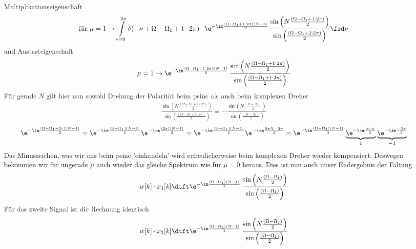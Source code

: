 \begin{ExCalc}
Multiplikationseigenschaft
\begin{align}
\text{für   }\mu=1\rightarrow
\int\limits_{\nu=0}^{2\pi}
\delta(-\nu+\Omega-\Omega_1+1\cdot2\pi)
\cdot
\e^{-\im\frac{(\Omega-\Omega_1 + 1\cdot2\pi)(N-1)}{2}}\,
\frac{\sin\left(N\frac{(\Omega-\Omega_1 + 1\cdot2\pi)}{2}\right)}{\sin\left(\frac{(\Omega-\Omega_1 + 1\cdot2\pi)}{2}\right)}\fsd \nu
\end{align}
und Austasteigenschaft
\begin{align}
\mu=1\rightarrow
\e^{-\im\frac{(\Omega-\Omega_1 + 1\cdot2\pi)(N-1)}{2}}\,
\frac{\sin\left(N\frac{(\Omega-\Omega_1 + 1\cdot2\pi)}{2}\right)}{\sin\left(\frac{(\Omega-\Omega_1 + 1\cdot2\pi)}{2}\right)}
\end{align}
Für gerade $N$ gilt hier nun sowohl Drehung der Polarität beim psinc als auch beim komplexen Dreher
\begin{align}
\frac{\sin\left(N\frac{(\Omega-\Omega_1 + 1\cdot2\pi)}{2}\right)}{\sin\left(\frac{(\Omega-\Omega_1 + 1\cdot2\pi)}{2}\right)}
= -
\frac{\sin\left(N\frac{(\Omega-\Omega_1)}{2}\right)}{\sin\left(\frac{(\Omega-\Omega_1)}{2}\right)}
\end{align}
%
\begin{align}
\e^{-\im\frac{(\Omega-\Omega_1 + 2\pi)(N-1)}{2}}=
\e^{-\im\frac{(\Omega-\Omega_1)(N-1)}{2}}
\e^{-\im\frac{(2\pi)(N-1)}{2}}=
\e^{-\im\frac{(\Omega-\Omega_1)(N-1)}{2}}
\e^{-\im\frac{2\pi N -2\pi}{2}}=
\e^{-\im\frac{(\Omega-\Omega_1)(N-1)}{2}}
\underbrace{\e^{-\im\frac{2\pi N}{2}}}_{1}
\underbrace{\e^{-\im\frac{-2\pi}{2}}}_{-1}
\end{align}
Das Minuszeichen, was wir uns beim psinc 'einhandeln' wird erfreulicherweise
beim komplexen Dreher wieder kompensiert.  Deswegen bekommen wir für ungerade $\mu$
auch wieder das gleiche Spektrum wie für $\mu=0$ heraus.
%
Dies ist nun auch unser Endergebnis der Faltung
\begin{align}
w[k] \cdot x_1[k]\dtft
\e^{-\im\frac{(\Omega-\Omega_1)(N-1)}{2}}\,
\frac{\sin\left(N\frac{(\Omega-\Omega_1)}{2}\right)}{\sin\left(\frac{(\Omega-\Omega_1)}{2}\right)}
\end{align}
Für das zweite Signal ist die Rechnung identisch
\begin{align}
w[k] \cdot x_2[k]\dtft
\e^{-\im\frac{(\Omega-\Omega_2)(N-1)}{2}}\,
\frac{\sin\left(N\frac{(\Omega-\Omega_2)}{2}\right)}{\sin\left(\frac{(\Omega-\Omega_2)}{2}\right)}
\end{align}
%
\end{ExCalc}
%

